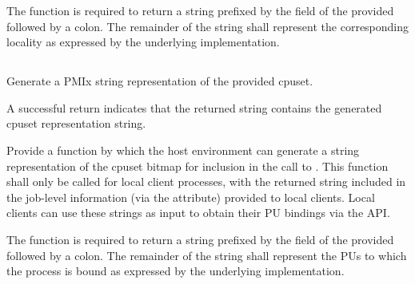 The function is required to return a string prefixed by the  field of the provided  followed by a colon. The remainder of the string shall represent the corresponding locality as expressed by the underlying implementation.

\subsection{}

\summary

Generate a \ac{PMIx} string representation of the provided cpuset.

\format


\begin{arglist}
\end{arglist}

A successful return indicates that the returned string contains the generated cpuset representation string.

\returnsimple

\descr

Provide a function by which the host environment can generate a string representation of the cpuset bitmap for inclusion in the call to . This function shall only be called for local client processes, with the returned string included in the job-level information (via the  attribute) provided to local clients. Local clients can use these strings as input to obtain their \ac{PU} bindings via the  \ac{API}.

The function is required to return a string prefixed by the  field of the provided  followed by a colon. The remainder of the string shall represent the \acp{PU} to which the process is bound as expressed by the underlying implementation.

